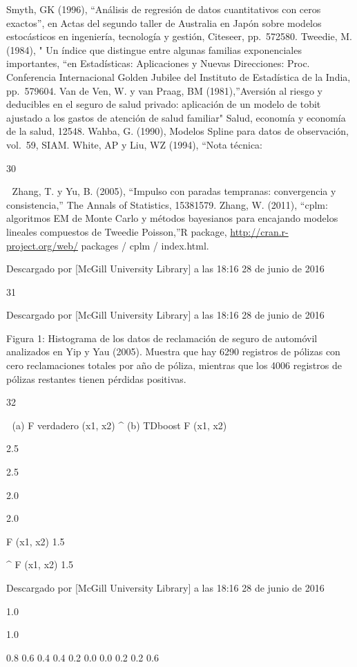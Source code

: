 \documentclass[]{article}
\begin{document}
Smyth, GK (1996), ``Análisis de regresión de datos cuantitativos con
ceros exactos'', en Actas del segundo taller de Australia en Japón sobre
modelos estocásticos en ingeniería, tecnología y gestión, Citeseer,
pp.~572580. Tweedie, M. (1984), " Un índice que distingue entre algunas
familias exponenciales importantes, ``en Estadísticas: Aplicaciones y
Nuevas Direcciones: Proc. Conferencia Internacional Golden Jubilee del
Instituto de Estadística de la India, pp.~579604. Van de Ven, W. y van
Praag, BM (1981),''Aversión al riesgo y deducibles en el seguro de salud
privado: aplicación de un modelo de tobit ajustado a los gastos de
atención de salud familiar" Salud, economía y economía de la salud,
12548. Wahba, G. (1990), Modelos Spline para datos de observación,
vol.~59, SIAM. White, AP y Liu, WZ (1994), ``Nota técnica:

30

 Zhang, T. y Yu, B. (2005), ``Impulso con paradas tempranas:
convergencia y consistencia,'' The Annals of Statistics, 15381579.
Zhang, W. (2011), ``cplm: algoritmos EM de Monte Carlo y métodos
bayesianos para encajando modelos lineales compuestos de Tweedie
Poisson,''R package, \url{http://cran.r-project.org/web/} packages /
cplm / index.html.

Descargado por {[}McGill University Library{]} a las 18:16 28 de junio
de 2016

31



Descargado por {[}McGill University Library{]} a las 18:16 28 de junio
de 2016

Figura 1: Histograma de los datos de reclamación de seguro de automóvil
analizados en Yip y Yau (2005). Muestra que hay 6290 registros de
pólizas con cero reclamaciones totales por año de póliza, mientras que
los 4006 registros de pólizas restantes tienen pérdidas positivas.

32

 (a) F verdadero (x1, x2) \^{} (b) TDboost F (x1, x2)

2.5

2.5

2.0

2.0

F (x1, x2) 1.5

\^{} F (x1, x2) 1.5

Descargado por {[}McGill University Library{]} a las 18:16 28 de junio
de 2016

1.0

1.0

0.8 0.6 0.4 0.4 0.2 0.0 0.0 0.2 0.2 0.6
\end{document}
